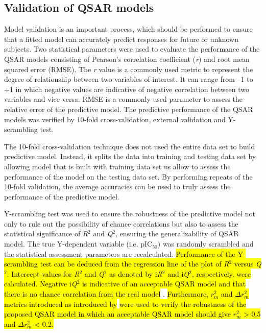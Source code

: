 \documentclass[fleqn,10pt]{wlpeerj}
\begin{document}
\subsection*{Validation of QSAR models}

Model validation is an important process, which should be performed to ensure that a fitted model can accurately predict responses for future or unknown subjects. Two statistical parameters were used to evaluate the performance of the QSAR models consisting of Pearson's correlation coefficient (\textit{r}) and root mean squared error (RMSE). The \textit{r} value is a commonly used metric to represent the degree of relationship between two variables of interest. It can range from --1 to +1 in which negative values are indicative of negative correlation between two variables and vice versa. RMSE is a commonly used parameter to assess the relative error of the predictive model. The predictive performance of the QSAR models was verified by 10-fold cross-validation, external validation and Y-scrambling test. 

The 10-fold cross-validation technique does not used the entire data set to build predictive model. Instead, it splits the data into training and testing data set by allowing model that is built with training  data set us allow to assess the performance of the model on the testing data set. By performing repeats of the 10-fold validation, the average accuracies can be used to truly assess the performance of the predictive model. 

Y-scrambling test was used to ensure the robustness of the predictive model not only to rule out the possibility of chance correlations but also to assess the statistical significance of \textit{R}$^2$ and \textit{Q}$^2$, ensuring the generalizability of QSAR model. The true Y-dependent variable (i.e. pIC$_{50}$) was randomly scrambled and the statistical assessment parameters are recalculated. \hl{Performance of the Y-scrambling test can be deduced from the regression line of the plot of \textit{R}$^2$ versus \textit{Q}$^2$. Intercept values for \textit{R}$^2$ and \textit{Q}$^2$ as denoted by i\textit{R}$^2$ and i\textit{Q}$^2$, respectively, were calculated. Negative i\textit{Q}$^2$ is indicative of an acceptable QSAR model and that there is no chance correlation from the real model} \citep{eriksson2003methods}. \hl{Furthermore, $r^{2}_{m}$ and $\Delta{r^{2}_{m}}$ metrics introduced as introduced by} \cite{roy2013some} \hl{were used to verify the robustness of the proposed QSAR model in which an acceptable QSAR model should give $r^{2}_{m}$ > 0.5 and $\Delta{r^{2}_{m}}$ < 0.2.} 
 
\end{document}
